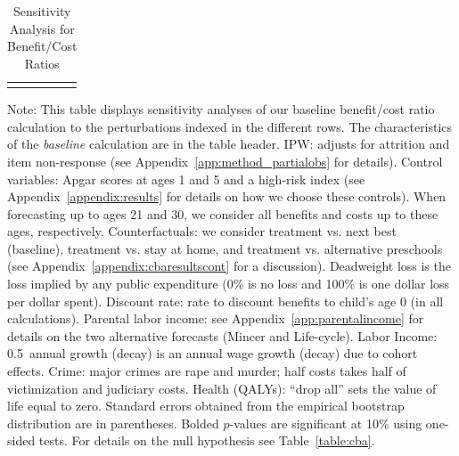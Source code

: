 \begin{table}
\begin{threeparttable}
\caption{Sensitivity Analysis for Benefit/Cost Ratios}
\label{table:bcsens}
\centering
\scriptsize
\begin{tabularx}{22.5cm}{XcX}
&  & \end{tabularx}
\begin{tablenotes}
\scriptsize
\item Note: This table displays sensitivity analyses of our baseline benefit/cost ratio calculation to the perturbations indexed in the different rows. The characteristics of the \textit{baseline} calculation are in the table header. IPW: adjusts for attrition and item non-response (see  Appendix~\ref{app:method_partialobs} for details). Control variables: Apgar scores at ages 1 and 5 and a high-risk index (see  Appendix~\ref{appendix:results} for details on how we choose these controls). When forecasting up to ages 21 and 30, we consider all benefits and costs up to these ages, respectively. Counterfactuals: we consider treatment vs. next best (baseline), treatment vs. stay at home, and treatment vs. alternative preschools (see Appendix~\ref{appendix:cbaresultscont} for a discussion). Deadweight loss is the loss implied by any public expenditure (0\% is no loss and 100\% is one dollar loss per dollar spent). Discount rate: rate to discount benefits to child's age 0 (in all calculations). Parental labor income: see  Appendix~\ref{app:parentalincome} for details on the two alternative forecasts (Mincer and Life-cycle). Labor Income: 0.5\ annual growth (decay) is an annual wage growth (decay) due to cohort effects. Crime: major crimes are rape and murder; half costs takes half of victimization and judiciary costs. Health (QALYs): ``drop all'' sets the value of life equal to zero. Standard errors obtained from the empirical bootstrap distribution are in parentheses. Bolded $p$-values are significant at 10\% using one-sided tests. For details on the null hypothesis see Table~\ref{table:cba}.
\end{tablenotes}
\end{threeparttable}
\end{table}

